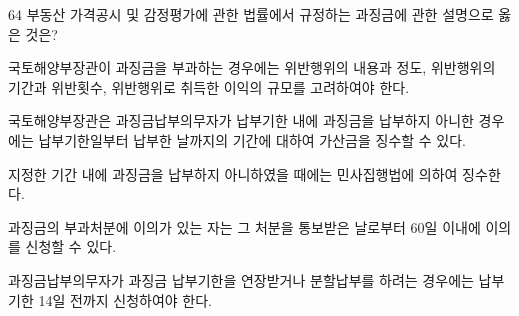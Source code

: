 \begin{question}{64}
부동산 가격공시 및 감정평가에 관한 법률에서 규정하는 과징금에 관한 설명으로 옳은 것은?
\begin{choices}
  \item 국토해양부장관이 과징금을 부과하는 경우에는 위반행위의 내용과 정도, 위반행위의 기간과 위반횟수, 위반행위로 취득한 이익의 규모를 고려하여야 한다.
  \item 국토해양부장관은 과징금납부의무자가 납부기한 내에 과징금을 납부하지 아니한 경우에는 납부기한일부터 납부한 날까지의 기간에 대하여 가산금을 징수할 수 있다.
  \item 지정한 기간 내에 과징금을 납부하지 아니하였을 때에는 민사집행법에 의하여 징수한다.
  \item 과징금의 부과처분에 이의가 있는 자는 그 처분을 통보받은 날로부터 60일 이내에 이의를 신청할 수 있다.
  \item 과징금납부의무자가 과징금 납부기한을 연장받거나 분할납부를 하려는 경우에는 납부기한 14일 전까지 신청하여야 한다.
\end{choices}
\end{question}
